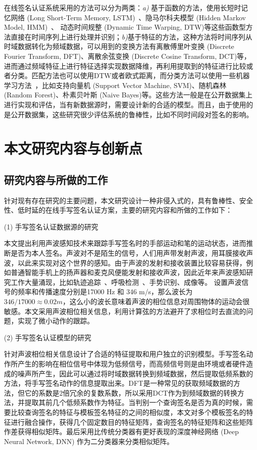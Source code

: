 在线签名认证系统采用的方法可以分为两类：\textit{a)} 基于函数的方法，使用长短时记忆网络 (Long Short-Term Memory, LSTM)~\cite{hochreiter1997long}、隐马尔科夫模型 (Hidden Markov Model, HMM)~\cite{rabiner1986introduction}、 动态时间规整 (Dynamic Time Warping, DTW)等这些函数型方法直接在时间序列上进行处理并识别；\textit{b)}基于特征的方法，这种方法将时间序列从时域数据转化为频域数据，可以用到的变换方法有离散傅里叶变换 (Discrete Fourier Transform, DFT)、离散余弦变换 (Discrete Cosine Transform, DCT)等，进而通过频域特征上进行特征选择实现数据降维，再利用提取到的特征进行比较或者分类。匹配方法也可以使用DTW或者欧式距离，而分类方法可以使用一些机器学习方法~\cite{周志华2016机器学习}，比如支持向量机 (Support Vector Machine, SVM)、随机森林 (Random Forest)、朴素贝叶斯 (Naive Bayes)等。这些方法一般是在公开数据集上进行实现和评估，当有新数据源时，需要设计新的合适的模型。而且，由于使用的是公开数据集，这些研究很少评估系统的鲁棒性，比如不同时间段对签名的影响。

\section{本文研究内容与创新点}
\subsection{研究内容与所做的工作}
针对现有存在研究的主要问题，本文研究设计一种非侵入式的，具有鲁棒性、安全性、低时延的在线手写签名认证方案，主要的研究内容和所做的工作如下：

(1) 手写签名认证数据源的研究

本文提出利用声波感知技术来跟踪手写签名时的手部运动和笔的运动状态，进而推断是否为本人签名。声波对不是陌生的信号，人们用声带发射声波，用耳膜接收声波，以此来实现对这个世界的感知。由于声波的发射和接收装置比较容易获得，例如普通智能手机上的扬声器和麦克风便能发射和接收声波，因此近年来声波感知研究工作大量涌现，比如轨迹追踪~\cite{wang2016device,mao2016cat,yun2017strata}、呼吸检测~\cite{WangContactless,wang2018c}、手势识别\cite{ruan2016audiogest,gupta2012soundwave,aumi2013doplink,ling2018ultragesture}、成像\cite{mao2017aim}等。
设置声波信号的频率和传播速度分别是17000 Hz 和 346 m/s，那么波长为  $346/17000\approx0.02m$，这么小的波长意味着声波的相位信息对周围物体的运动会很敏感。本文采用声波相位相关信息，利用计算弦的方法避开了求相位时去直流的问题，实现了微小动作的跟踪。


(2) 手写签名认证模型的研究

针对声波相位相关信息设计了合适的特征提取和用户独立的识别模型。手写签名动作所产生的影响在相位信号中体现为低频信号，而高频信号则是由环境或者硬件造成的噪声所产生，因此可以通过将时域数据转换到频域数据，然后提取低频系数的方法，将手写签名动作的信息提取出来。DFT是一种常见的获取频域数据的方法，但它的系数是2倍冗余的复数系数，所以采用DCT作为到频域数据的转换方法，并提取其前几个低频系数作为特征。当判别一个查询签名是否为真的时候，需要比较查询签名的特征与模板签名特征的之间的相似度，本文对多个模板签名的特征进行融合操作，获得几个固定数目的特征矩阵，查询签名的特征矩阵和这些矩阵作差获得相似矩阵。最后采用比传统分类器有更好表现的深度神经网络 (Deep Neural Network, DNN)\cite{Schmidhuber2015Deep} 作为二分类器来分类相似矩阵。

